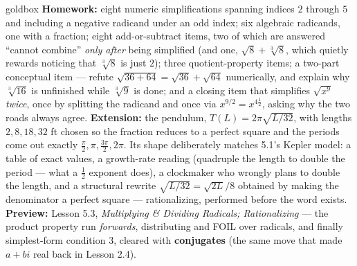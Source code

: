 \documentclass[10pt]{article}
\begin{document}
\begin{skillbox}{goldbox}
\textbf{Homework:} eight numeric simplifications spanning indices $2$ through $5$ and including a
negative radicand under an odd index; six algebraic radicands, one with a fraction; eight
add-or-subtract items, two of which are answered ``cannot combine'' \emph{only after} being
simplified (and one, $\sqrt8+\sqrt[3]8$, which quietly rewards noticing that $\sqrt[3]8$ is just
$2$); three quotient-property items; a two-part conceptual item --- refute
$\sqrt{36+64}=\sqrt{36}+\sqrt{64}$ numerically, and explain why $\sqrt[3]{16}$ is unfinished while
$\sqrt[3]{9}$ is done; and a closing item that simplifies $\sqrt{x^{9}}$ \emph{twice}, once by
splitting the radicand and once via $x^{9/2}=x^{4\frac12}$, asking why the two roads always agree.
\textbf{Extension:} the pendulum, $T(L)=2\pi\sqrt{L/32}$, with lengths $2,8,18,32$ ft chosen so the
fraction reduces to a perfect square and the periods come out exactly $\frac\pi2,\pi,\frac{3\pi}2,
2\pi$. Its shape deliberately matches 5.1's Kepler model: a table of exact values, a growth-rate
reading (quadruple the length to double the period --- what a $\frac12$ exponent does), a
clockmaker who wrongly plans to double the length, and a structural rewrite
$\sqrt{L/32}=\sqrt{2L}/8$ obtained by making the denominator a perfect square --- rationalizing,
performed before the word exists. \textbf{Preview:} Lesson 5.3, \emph{Multiplying \& Dividing
Radicals; Rationalizing} --- the product property run \emph{forwards}, distributing and FOIL over
radicals, and finally simplest-form condition 3, cleared with \textbf{conjugates} (the same move
that made $a+bi$ real back in Lesson 2.4).
\end{skillbox}
\end{document}
